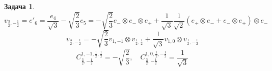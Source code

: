 \documentclass[12pt]{article}
\theoremstyle{definition}
\newtheorem{zad}{Задача}[section]
\begin{document}
\begin{zad}
    \begin{equation}
        v_{\frac{3}{2},-\frac{1}{2}}=e'_6=\frac{e_4}{\sqrt{3}}-\sqrt{\frac{2}{3}}e_5=-\sqrt{\frac{2}{3}}e_-\otimes e_-\otimes e_++\frac{1}{\sqrt{3}}\frac{1}{\sqrt{2}}(e_+\otimes e_-+e_-\otimes e_+)\otimes e_-
    \end{equation}
    \begin{equation}
        v_{\frac{3}{2},-\frac{1}{2}}=-\sqrt{\frac{2}{3}}v_{1,-1}\otimes v_{\frac{1}{2},\frac{1}{2}}+\frac{1}{\sqrt{3}}v_{1,0}\otimes v_{\frac{1}{2},-\frac{1}{2}}
    \end{equation}
    \begin{equation}
        \boxed{C_{\frac{3}{2},-\frac{1}{2}}^{1,-1,\frac{1}{2},\frac{1}{2}}=-\sqrt{\frac{2}{3}},\quad C_{\frac{3}{2},-\frac{1}{2}}^{1,0,\frac{1}{2},-\frac{1}{2}}=\frac{1}{\sqrt{3}}}
    \end{equation}
\end{zad}
\end{document}

